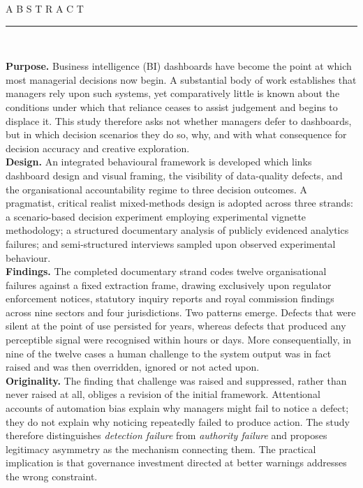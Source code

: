 \documentclass[11pt,a4paper]{article}
\numberwithin{figure}{section}
\numberwithin{table}{section}
\begin{document}
\begin{minipage}[t]{0.68\textwidth}
{\footnotesize\sffamily A B S T R A C T}\\[2pt]
\rule{\linewidth}{0.4pt}\\[4pt]
{\footnotesize{}
\textbf{Purpose.} Business intelligence (BI) dashboards have become the point at which most managerial
decisions now begin. A substantial body of work establishes that managers rely upon such systems, yet
comparatively little is known about the conditions under which that reliance ceases to assist judgement and
begins to displace it. This study therefore asks not whether managers defer to dashboards, but in which
decision scenarios they do so, why, and with what consequence for decision accuracy and creative
exploration.\\[3pt]
\textbf{Design.} An integrated behavioural framework is developed which links dashboard design and visual
framing, the visibility of data-quality defects, and the organisational accountability regime to three
decision outcomes. A pragmatist, critical realist mixed-methods design is adopted across three strands: a
scenario-based decision experiment employing experimental vignette methodology; a structured documentary
analysis of publicly evidenced analytics failures; and semi-structured interviews sampled upon observed
experimental behaviour.\\[3pt]
\textbf{Findings.} The completed documentary strand codes twelve organisational failures against a fixed
extraction frame, drawing exclusively upon regulator enforcement notices, statutory inquiry reports and
royal commission findings across nine sectors and four jurisdictions. Two patterns emerge. Defects that
were silent at the point of use persisted for years, whereas defects that produced any perceptible signal
were recognised within hours or days. More consequentially, in nine of the twelve cases a human challenge
to the system output was in fact raised and was then overridden, ignored or not acted upon.\\[3pt]
\textbf{Originality.} The finding that challenge was raised and suppressed, rather than never raised at
all, obliges a revision of the initial framework. Attentional accounts of automation bias explain why
managers might fail to notice a defect; they do not explain why noticing repeatedly failed to produce
action. The study therefore distinguishes \emph{detection failure} from \emph{authority failure} and
proposes legitimacy asymmetry as the mechanism connecting them. The practical implication is that
governance investment directed at better warnings addresses the wrong constraint.\par}
\end{minipage}
\end{document}
